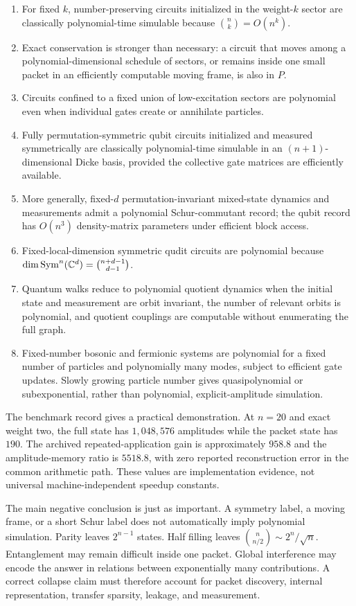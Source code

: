 \begin{enumerate}
\item For fixed $k$, number-preserving circuits initialized in the weight-$k$ sector are classically polynomial-time simulable because $\binom nk=O(n^k)$.
\item Exact conservation is stronger than necessary: a circuit that moves among a polynomial-dimensional schedule of sectors, or remains inside one small packet in an efficiently computable moving frame, is also in $P$.
\item Circuits confined to a fixed union of low-excitation sectors are polynomial even when individual gates create or annihilate particles.
\item Fully permutation-symmetric qubit circuits initialized and measured symmetrically are classically polynomial-time simulable in an $(n+1)$-dimensional Dicke basis, provided the collective gate matrices are efficiently available.
\item More generally, fixed-$d$ permutation-invariant mixed-state dynamics and measurements admit a polynomial Schur-commutant record; the qubit record has $O(n^3)$ density-matrix parameters under efficient block access.
\item Fixed-local-dimension symmetric qudit circuits are polynomial because $\dim\operatorname{Sym}^n(\mathbb C^d)=\binom{n+d-1}{d-1}$.
\item Quantum walks reduce to polynomial quotient dynamics when the initial state and measurement are orbit invariant, the number of relevant orbits is polynomial, and quotient couplings are computable without enumerating the full graph.
\item Fixed-number bosonic and fermionic systems are polynomial for a fixed number of particles and polynomially many modes, subject to efficient gate updates. Slowly growing particle number gives quasipolynomial or subexponential, rather than polynomial, explicit-amplitude simulation.
\end{enumerate}

The benchmark record gives a practical demonstration. At $n=20$ and exact weight two, the full state has $1{,}048{,}576$ amplitudes while the packet state has $190$. The archived repeated-application gain is approximately $958.8$ and the amplitude-memory ratio is $5518.8$, with zero reported reconstruction error in the common arithmetic path. These values are implementation evidence, not universal machine-independent speedup constants.

The main negative conclusion is just as important. A symmetry label, a moving frame, or a short Schur label does not automatically imply polynomial simulation. Parity leaves $2^{n-1}$ states. Half filling leaves $\binom{n}{n/2}\sim 2^n/\sqrt n$. Entanglement may remain difficult inside one packet. Global interference may encode the answer in relations between exponentially many contributions. A correct collapse claim must therefore account for packet discovery, internal representation, transfer sparsity, leakage, and measurement.
